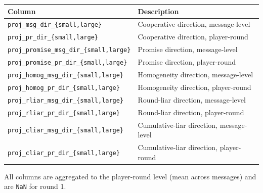 \documentclass[11pt,oneside]{article}
\begin{document}
\begin{center}
\footnotesize
\begin{tabular}{ll}
\toprule
Column & Description \\
\midrule
\texttt{proj\_msg\_dir\_\{small,large\}} & Cooperative direction, message-level \\
\texttt{proj\_pr\_dir\_\{small,large\}} & Cooperative direction, player-round \\
\texttt{proj\_promise\_msg\_dir\_\{small,large\}} & Promise direction, message-level \\
\texttt{proj\_promise\_pr\_dir\_\{small,large\}} & Promise direction, player-round \\
\texttt{proj\_homog\_msg\_dir\_\{small,large\}} & Homogeneity direction, message-level \\
\texttt{proj\_homog\_pr\_dir\_\{small,large\}} & Homogeneity direction, player-round \\
\texttt{proj\_rliar\_msg\_dir\_\{small,large\}} & Round-liar direction, message-level \\
\texttt{proj\_rliar\_pr\_dir\_\{small,large\}} & Round-liar direction, player-round \\
\texttt{proj\_cliar\_msg\_dir\_\{small,large\}} & Cumulative-liar direction, message-level \\
\texttt{proj\_cliar\_pr\_dir\_\{small,large\}} & Cumulative-liar direction, player-round \\
\bottomrule
\end{tabular}
\end{center}

All columns are aggregated to the player-round level (mean across messages) and are \texttt{NaN} for round 1.
\end{document}
